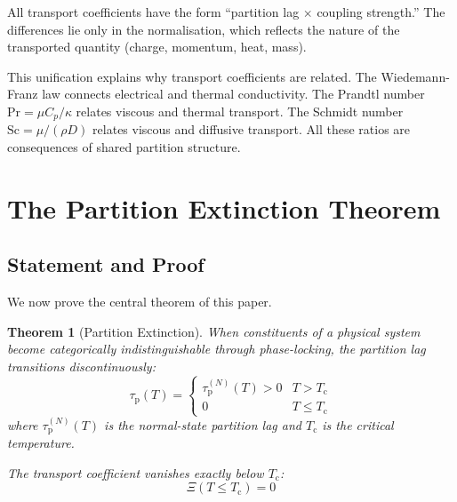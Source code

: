 \documentclass[twocolumn,10pt,aps,prd,superscriptaddress,nofootinbib]{revtex4-2}
\newtheorem{theorem}{Theorem}[section]
\theoremstyle{remark}
\newcommand{\tauP}{\tau_{\mathrm{p}}}
\newcommand{\Tcrit}{T_{\mathrm{c}}}
\newcommand{\Transp}{\Xi}
\begin{document}
All transport coefficients have the form ``partition lag $\times$ coupling strength.'' The differences lie only in the normalisation, which reflects the nature of the transported quantity (charge, momentum, heat, mass).

This unification explains why transport coefficients are related. The Wiedemann-Franz law connects electrical and thermal conductivity. The Prandtl number $\text{Pr} = \mu C_p / \kappa$ relates viscous and thermal transport. The Schmidt number $\text{Sc} = \mu / (\rho D)$ relates viscous and diffusive transport. All these ratios are consequences of shared partition structure.


\section{The Partition Extinction Theorem}
\label{sec:extinction}

\subsection{Statement and Proof}

We now prove the central theorem of this paper.

\begin{theorem}[Partition Extinction]
\label{thm:extinction}
When constituents of a physical system become categorically indistinguishable through phase-locking, the partition lag transitions discontinuously:
\begin{equation}
\tauP(T) = \begin{cases}
\tauP^{(N)}(T) > 0 & T > \Tcrit \\
0 & T \leq \Tcrit
\end{cases}
\label{eq:partition_extinction}
\end{equation}
where $\tauP^{(N)}(T)$ is the normal-state partition lag and $\Tcrit$ is the critical temperature.

The transport coefficient vanishes exactly below $\Tcrit$:
\begin{equation}
\Transp(T \leq \Tcrit) = 0
\label{eq:transport_extinction}
\end{equation}
\end{theorem}
\end{document}
